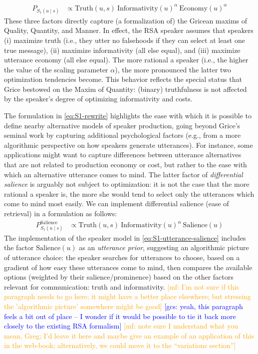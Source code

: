 \documentclass{sp}
\newcommand{\gcs}[1]{\textcolor{blue}{[gcs: #1]}}
\newcommand{\mf}[1]{\textcolor{orange}{[mf: #1]}}
\newcommand{\sem}[1]{\ensuremath{[\![#1]\!]}}
\begin{document}
\begin{align} \label{eq:S1-three-factor-formulation}
  P_{S_1(u\mid s)}   & \propto \text{Truth}(u,s) \ \text{Informativity}(u)^{\alpha} \ \text{Economy}(u)^{\alpha} %
\end{align}
These three factors directly capture (a formalization of) the Gricean maxims of Quality,
Quantity, and Manner. In effect, the RSA speaker assumes that speakers (i) maximize truth
(i.e., they utter no falsehoods if they can select at least one
true message), (ii) maximize informativity (all else equal), and (iii) maximize utterance
economy (all else equal). The more rational a speaker (i.e., the higher the value of the scaling parameter $\alpha$), the more
pronounced the latter two optimization tendencies become. This behavior reflects the special
status that Grice bestowed on the Maxim of Quantity: (binary) truthfulness is not affected by
the speaker's degree of optimizing informativity and costs.

The formulation in \eqref{eq:S1-rewrite} highlights the ease with which it is possible to define nearby
alternative models of speaker production, going beyond Grice's seminal work by
capturing additional psychological factors (e.g., from a more algorithmic perspective on how speakers
generate utterances). For instance, some applications might want to capture differences between
utterance alternatives that are not related to production economy or cost, but rather to the
ease with which an alternative utterance comes to mind. The latter factor of \emph{differential
  salience} is arguably not subject to optimization: it is not the case that the more rational
a speaker is, the more she would tend to select only the utterances which come to mind most
easily. We can implement differential salience (ease of retrieval) in a
formulation as follows:
%
\begin{align}
  \label{eq:S1-utterance-salience}
  P_{S_1(u\mid s)}^{\text{Salience}}   & \propto \text{Truth}(u,s) \ \text{Informativity}(u)^{\alpha} \ \text{Salience}(u)
\end{align}
The implementation of the speaker model in \eqref{eq:S1-utterance-salience} includes the
factor $\text{Salience}(u)$ as an \emph{utterance prior}, suggesting an algorithmic
picture of utterance choice: the speaker searches for utterances to choose, based on a gradient
of how easy these utterances come to mind, then compares the available options (weighted by
their salience/prominence) based on the other factors relevant for communication: truth and
informativity. \mf{I'm not sure if this paragraph needs to go here; it might have a better
  place elsewhere; but stressing the 'algorithmic picture' somewhere might be good} \gcs{yeah, this paragraph feels a bit out of place -- I wonder if it would be possible to tie it back more closely to the existing RSA formalism} \mf{note sure I understand what you mean,  Greg; I'd leave it here and maybe give an example of an application of this in the web-book; alternatively, we could move it to the ``variations section''}
\end{document}
